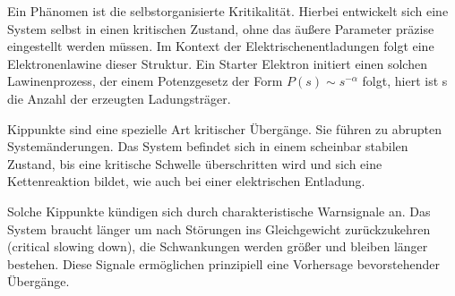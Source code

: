 Ein Phänomen ist die selbstorganisierte Kritikalität. Hierbei entwickelt sich eine System selbst in einen kritischen Zustand, ohne das äußere Parameter präzise eingestellt werden müssen. Im Kontext der Elektrischenentladungen folgt eine Elektronenlawine dieser Struktur. Ein Starter Elektron initiert einen solchen Lawinenprozess, der einem Potenzgesetz der Form \(P(s) \sim s^{-\alpha}\) folgt, hiert ist s die Anzahl der erzeugten Ladungsträger.

Kippunkte sind eine spezielle Art kritischer Übergänge. Sie führen zu abrupten Systemänderungen. Das System befindet sich in einem scheinbar stabilen Zustand, bis eine kritische Schwelle überschritten wird und sich eine Kettenreaktion bildet, wie auch bei einer elektrischen Entladung.

Solche Kippunkte kündigen sich durch charakteristische Warnsignale an. Das System braucht länger um nach Störungen ins Gleichgewicht zurückzukehren (critical slowing down), die Schwankungen werden größer und bleiben länger bestehen. Diese Signale ermöglichen prinzipiell eine Vorhersage bevorstehender Übergänge. 
